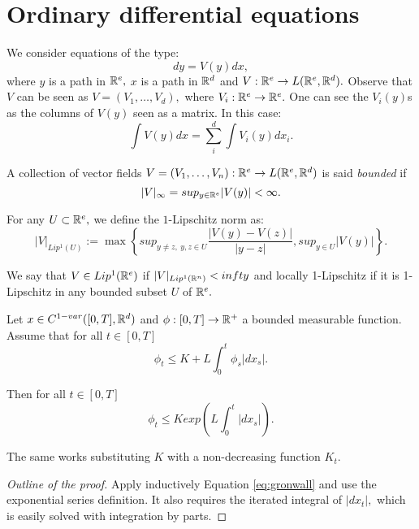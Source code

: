\section{Ordinary differential equations}

We consider equations of the type:
\begin{equation}
    dy = V(y) dx,
\end{equation}
where $y$ is a path in $\mathbb{R}^e,$ $x$ is a path in $\mathbb{R}^d$ and $V:\mathbb{R}^e \rightarrow L(\mathbb{R}^e, \mathbb{R}^d).$
Observe that $V$ can be seen as $V = (V_1, \ldots, V_d),$ where $V_i: \mathbb{R}^e \rightarrow \mathbb{R}^e.$
One can see the $V_i(y)$s as the columns of $V(y)$ seen as a matrix.
In this case:
\begin{equation}
    \int V(y) dx = \sum_i^d \int V_i(y) dx_i.
\end{equation} 

\begin{definition}
    A collection of vector fields $V = (V_1, \ldots, V_n) : \mathbb{R}^e \rightarrow L(\mathbb{R}^e, \mathbb{R}^d)$ is said \textit{bounded} if
    \begin{equation}
        |V|_\infty = sup_{y \in \mathbb{R}^e} |V(y)| < \infty.
    \end{equation}

    For any $U \subset \mathbb{R}^e,$ we define the $1$-Lipschitz norm as:
    \begin{equation}
        |V|_{Lip^1(U)} := \max \left\{ sup_{y \neq z,\ y,z \in U} \frac{|V(y) - V(z)|}{|y - z|}, sup_{y \in U} |V(y)| \right\}.
    \end{equation}

    We say that $V \in Lip^1(\mathbb{R}^e)$ if $|V|_{Lip^1(\mathbb{R}^n)} < infty$ and locally 1-Lipschitz if it is 1-Lipschitz in any bounded subset $U$ of $\mathbb{R}^e.$
\end{definition}

\begin{lemma}
    Let $x \in C^{1-var}([0,T], \mathbb{R}^d)$ and $\phi:[0,T] \rightarrow \mathbb{R}^+$ a bounded measurable function. Assume that for all $t \in [0,T]$
    \begin{equation}\label{eq:gronwall}
        \phi_t \leq K + L \int_0^t \phi_s |dx_s|.
    \end{equation}

    Then for all $t \in [0,T]$
    \begin{equation}
        \phi_t \leq K exp\left( L \int_0^t |dx_s| \right).
    \end{equation}

    The same works substituting $K$ with a non-decreasing function $K_t.$
\end{lemma}
\begin{proof}[Outline of the proof]
    Apply inductively Equation \eqref{eq:gronwall} and use the exponential series definition.
    It also requires the iterated integral of $|dx_t|,$ which is easily solved with integration by parts.
\end{proof}

